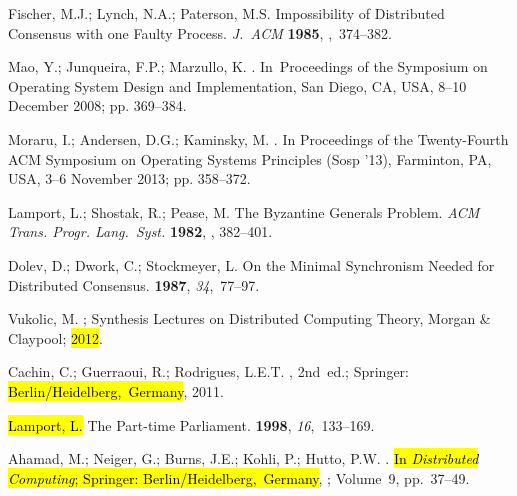 \documentclass[algorithms,article,accept,moreauthors,pdftex,10pt,a4paper]{Definitions/mdpi}
\begin{document}
\begin{thebibliography}{999}
Fischer, M.J.; Lynch, N.A.; Paterson, M.S.
\newblock Impossibility of Distributed Consensus with one Faulty Process. \emph{J.~ACM}  {\bf
1985},
,~374--382.

Mao, Y.; Junqueira, F.P.; Marzullo, K.
.
\newblock In~Proceedings of the Symposium on Operating System Design and
Implementation, San Diego, CA, USA, 8--10 December 2008; pp. 369--384.

Moraru, I.; Andersen, D.G.; Kaminsky, M.
.
\newblock In Proceedings of the Twenty-Fourth ACM Symposium on Operating Systems Principles (Sosp '13), Farminton, PA, USA, 3--6 November 2013;  pp. 358--372.

Lamport, L.; Shostak, R.; Pease, M.
\newblock The {Byzantine} Generals Problem. \emph{ACM Trans. Progr. Lang.~Syst.} {\bf 1982},
, 382--401.

Dolev, D.; Dwork, C.; Stockmeyer, L.
\newblock On the Minimal Synchronism Needed for Distributed Consensus.
 {\bf 1987}, {\em 34},~77--97.

Vukolic, M.
;
Synthesis Lectures on Distributed Computing Theory, Morgan {\&} Claypool;
\hl{2012}.%

Cachin, C.; Guerraoui, R.; Rodrigues, L.E.T.
, 2nd~ed.; Springer: \hl{\mbox{Berlin/Heidelberg, Germany}}, 2011.

\hl{Lamport, L.} %
\newblock The Part-time Parliament.
 {\bf 1998}, {\em 16},~133--169.

Ahamad, M.; Neiger, G.; Burns, J.E.; Kohli, P.; Hutto, P.W.
. \hl{In \emph{Distributed Computing}; Springer: \mbox{Berlin/Heidelberg, Germany}}, 
; Volume~9, pp.~37--49.


\end{thebibliography}
\end{document}
